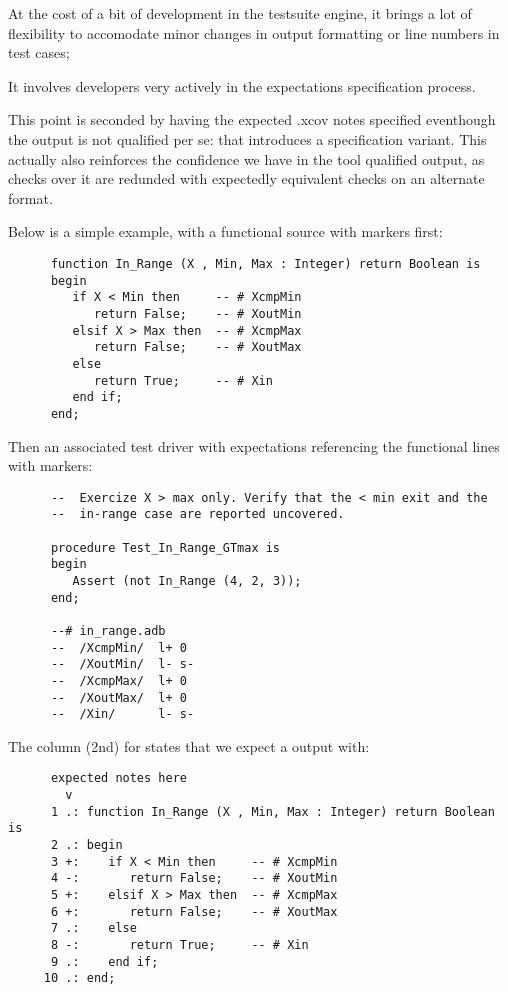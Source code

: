 \documentclass {report}
\begin{document}
\begin{Itemize}
\item%
  At the cost of a bit of development in the testsuite engine, it brings
  a lot of flexibility to accomodate minor changes in output formatting
  or line numbers in test cases;
%
\item%
  It involves developers very actively in the expectations specification
  process.  

  This point is seconded by having the expected .xcov notes specified
  eventhough the  output is not qualified per se: that
  introduces a specification variant.
  This actually also reinforces the confidence we have in the tool qualified
  output, as checks over it are redunded with expectedly equivalent checks on
  an alternate format.
\end{Itemize}
 
Below is a simple example, with a functional  source
with \T{-{}- \#} markers first:

\begin{verbatim}
      function In_Range (X , Min, Max : Integer) return Boolean is
      begin
         if X < Min then     -- # XcmpMin
            return False;    -- # XoutMin
         elsif X > Max then  -- # XcmpMax
            return False;    -- # XoutMax
         else
            return True;     -- # Xin
         end if;
      end;
\end{verbatim}

Then an associated test driver with expectations referencing the functional
lines with markers:

\begin{verbatim}
      --  Exercize X > max only. Verify that the < min exit and the
      --  in-range case are reported uncovered.

      procedure Test_In_Range_GTmax is
      begin
         Assert (not In_Range (4, 2, 3));
      end;

      --# in_range.adb
      --  /XcmpMin/  l+ 0
      --  /XoutMin/  l- s-
      --  /XcmpMax/  l+ 0
      --  /XoutMax/  l+ 0
      --  /Xin/      l- s-
\end{verbatim}

The  column (2nd) for  states
that we expect a  output with:

\begin{verbatim}
      expected notes here
        v
      1 .: function In_Range (X , Min, Max : Integer) return Boolean is
      2 .: begin
      3 +:    if X < Min then     -- # XcmpMin
      4 -:       return False;    -- # XoutMin
      5 +:    elsif X > Max then  -- # XcmpMax
      6 +:       return False;    -- # XoutMax
      7 .:    else
      8 -:       return True;     -- # Xin
      9 .:    end if;
     10 .: end;
\end{verbatim}
\end{document}
